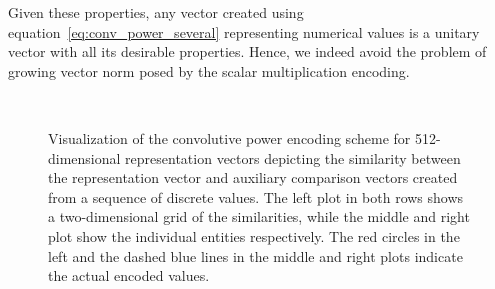 Given these properties, any vector created using equation~\eqref{eq:conv_power_several} representing numerical values is a unitary vector with all its desirable properties.
Hence, we indeed avoid the problem of growing vector norm posed by the scalar multiplication encoding.

\begin{figure}[t]
    \centering
    \\
    \caption{
        Visualization of the convolutive power encoding scheme for \num{512}-dimensional representation vectors depicting the similarity between the representation vector and auxiliary comparison vectors created from a sequence of discrete values.
        The left plot in both rows shows a two-dimensional grid of the similarities, while the middle and right plot show the individual entities respectively.
        The red circles in the left and the dashed blue lines in the middle and right plots indicate the
    actual encoded values.}
    \label{fig:spa_power_encoding}
\end{figure}

